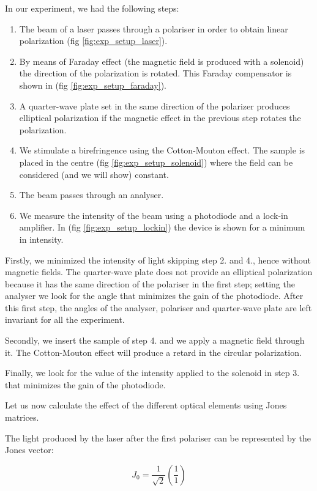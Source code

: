 \documentclass[11pt,a4paper]{article}
\begin{document}
In our experiment, we had the following steps:

\begin{enumerate}
\item The beam of a laser passes through a polariser in order to obtain linear polarization (fig \ref{fig:exp_setup_laser}).
\item By means of Faraday effect (the magnetic field is produced with a solenoid) the direction of the polarization is rotated. This Faraday compensator is shown in (fig \ref{fig:exp_setup_faraday}).
\item A quarter-wave plate set in the same direction of the polarizer produces elliptical polarization if the magnetic effect in the previous step rotates the polarization.
\item We stimulate a birefringence using the Cotton-Mouton effect. The sample is placed in the centre (fig \ref{fig:exp_setup_solenoid}) where the field can be considered (and we will show) constant.
\item The beam passes through an analyser.
\item We measure the intensity of the beam using a photodiode and a lock-in amplifier. In (fig \ref{fig:exp_setup_lockin}) the device is shown for a minimum in intensity.
\end{enumerate}	

Firstly, we minimized the intensity of light skipping step 2. and 4., hence without magnetic fields.  The quarter-wave plate does not provide an elliptical polarization because it has the same direction of the polariser in the first step; setting the analyser we look for the angle that minimizes the gain of the photodiode. After this first step, the angles of the analyser, polariser and quarter-wave plate are left invariant for all the experiment.

Secondly, we insert the sample of step 4. and we apply a magnetic field through it. The Cotton-Mouton effect will produce a retard in the circular polarization. 

Finally, we look for the value of the intensity applied to the solenoid in step 3. that minimizes the gain of the photodiode. 

Let us now calculate the effect of the different optical elements using Jones matrices.

The light produced by the laser after the first polariser can be represented by the Jones vector:

\begin{equation}\label{eq:initial_jones}
J_0=\frac{1}{\sqrt{2}}\left(\frac{1}{1}\right)
\end{equation}
\end{document}
